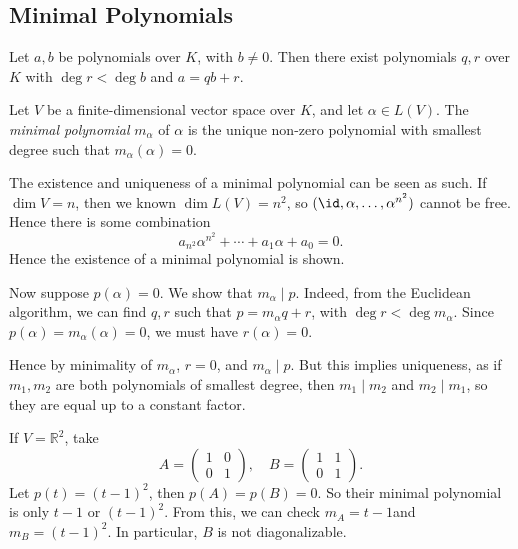 \documentclass[12pt]{article}
\begin{document}
\subsection{Minimal Polynomials}%
\label{sub:minimal_polynomials}

\begin{proposition}
	Let $a, b$ be polynomials over $K$, with $b \neq 0$. Then there exist polynomials $q, r$ over $K$ with $\deg r < \deg b$ and $a = qb + r$.
\end{proposition}

\begin{definition}
	Let $V$ be a finite-dimensional vector space over $K$, and let $\alpha \in L(V)$. The \textit{minimal polynomial} $m_{\alpha}$ of $\alpha$ is the unique non-zero polynomial with smallest degree such that $m_{\alpha}(\alpha) = 0$.
\end{definition}

The existence and uniqueness of a minimal polynomial can be seen as such. If $\dim V = n$, then we known $\dim L(V) = n^2$, so $(\id, \alpha, \ldots, \alpha^{n^2})$ cannot be free. Hence there is some combination
\[
a_{n^2}\alpha^{n^2} + \cdots + a_1 \alpha + a_0 = 0
.\]
Hence the existence of a minimal polynomial is shown.

Now suppose $p(\alpha) = 0$. We show that $m_{\alpha} \mid p$. Indeed, from the Euclidean algorithm, we can find $q, r$ such that $p = m_{\alpha}q + r$, with $\deg r < \deg m_{\alpha}$. Since $p(\alpha) = m_{\alpha}(\alpha) = 0$, we must have $r(\alpha) = 0$.

Hence by minimality of $m_{\alpha}$, $r = 0$, and $m_{\alpha} \mid p$. But this implies uniqueness, as if $m_1, m_2$ are both polynomials of smallest degree, then $m_1 \mid m_2$ and $m_2 \mid m_1$, so they are equal up to a constant factor.

\begin{exbox}
	If $V = \mathbb{R}^2$, take
	\[
	A =
	\begin{pmatrix}
		1 & 0 \\
		0 & 1
	\end{pmatrix}
	, \quad B =
	\begin{pmatrix}
		1 & 1 \\
		0 & 1
	\end{pmatrix}
	.\]
	Let $p(t) = (t - 1)^2$, then $p(A) = p(B) = 0$. So their minimal polynomial is only $t - 1$ or $(t - 1)^2$. From this, we can check $m_{A} = t - 1$and $m_{B} = (t - 1)^2$. In particular, $B$ is not diagonalizable.
\end{exbox}
\end{document}
